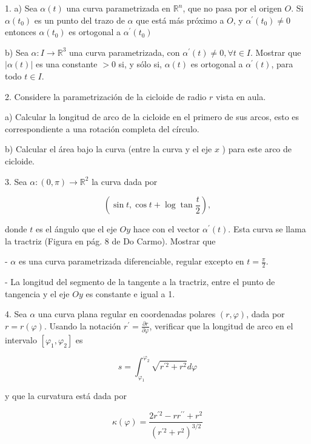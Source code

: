 






\begin{problema}
    1. a) Sea $\alpha(t)$ una curva parametrizada en $\mathbb{R}^{n}$, que no pasa por el origen $O$. Si $\alpha\left(t_{0}\right)$ es un punto del trazo de $\alpha$ que está más próximo a $O$, y $\alpha^{\prime}\left(t_{0}\right) \neq 0$ entonces $\alpha\left(t_{0}\right)$ es ortogonal a $\alpha^{\prime}\left(t_{0}\right)$

b) Sea $\alpha: I \rightarrow \mathbb{R}^{3}$ una curva parametrizada, con $\alpha^{\prime}(t) \neq 0, \forall t \in I$. Mostrar que $|\alpha(t)|$ es una constante $>0$ si, y sólo si, $\alpha(t)$ es ortogonal a $\alpha^{\prime}(t)$, para todo $t \in I$.
\end{problema}

\begin{problema}
    2. Considere la parametrización de la cicloide de radio $r$ vista en aula.

a) Calcular la longitud de arco de la cicloide en el primero de sus arcos, esto es correspondiente a una rotación completa del círculo.

b) Calcular el área bajo la curva (entre la curva y el eje $x$ ) para este arco de cicloide.
\end{problema}

\begin{problema}


3. Sea $\alpha:(0, \pi) \rightarrow \mathbb{R}^{2}$ la curva dada por

$$
\left(\sin t, \cos t+\log \tan \frac{t}{2}\right),
$$

donde $t$ es el ángulo que el eje $O y$ hace con el vector $\alpha^{\prime}(t)$. Esta curva se llama la tractriz (Figura en pág. 8 de Do Carmo). Mostrar que

- $\alpha$ es una curva parametrizada diferenciable, regular excepto en $t=\frac{\pi}{2}$.

- La longitud del segmento de la tangente a la tractriz, entre el punto de tangencia y el eje $O y$ es constante e igual a 1.

\end{problema}

\begin{problema}


4. Sea $\alpha$ una curva plana regular en coordenadas polares $(r, \varphi)$, dada por $r=r(\varphi)$. Usando la notación $r^{\prime}=\frac{\partial r}{\partial \varphi}$, verificar que la longitud de arco en el intervalo $\left[\varphi_{1}, \varphi_{2}\right]$ es

$$
s=\int_{\varphi_{1}}^{\varphi_{2}} \sqrt{r^{\prime 2}+r^{2}} d \varphi
$$

y que la curvatura está dada por

$$
\kappa(\varphi)=\frac{2 r^{\prime 2}-r r^{\prime \prime}+r^{2}}{\left(r^{\prime 2}+r^{2}\right)^{3 / 2}}
$$

\end{problema}

